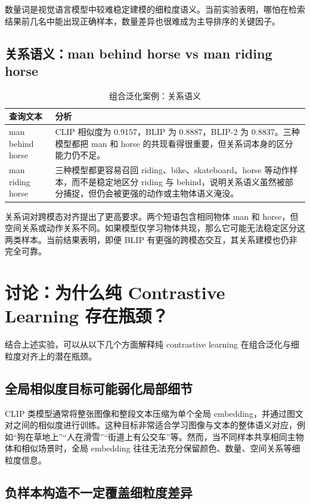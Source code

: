 \documentclass[UTF8,a4paper,10pt]{ctexart}
\begin{document}
数量词是视觉语言模型中较难稳定建模的细粒度语义。当前实验表明，哪怕在检索结果前几名中能出现正确样本，数量差异也很难成为主导排序的关键因子。

\subsection{关系语义：man behind horse vs man riding horse}

\begin{table}[H]
    \centering
    \caption{组合泛化案例：关系语义}
    \begin{tabular}{p{4cm}p{10cm}}
        \toprule
        查询文本 & 分析 \\
        \midrule
        man behind horse & CLIP 相似度为 0.9157，BLIP 为 0.8887，BLIP-2 为 0.8837。三种模型都把 man 和 horse 的共现看得很重要，但关系词本身的区分能力仍不足。 \\
        man riding horse & 三种模型都更容易召回 riding、bike、skateboard、horse 等动作样本，而不是稳定地区分 riding 与 behind，说明关系语义虽然被部分捕捉，但仍会被更强的动作或主物体语义淹没。 \\
        \bottomrule
    \end{tabular}
\end{table}

关系词对跨模态对齐提出了更高要求。两个短语包含相同物体 man 和 horse，但空间关系或动作关系不同。如果模型仅学习物体共现，那么它可能无法稳定区分这两类样本。当前结果表明，即便 BLIP 有更强的跨模态交互，其关系建模也仍非完全可靠。

\section{讨论：为什么纯 Contrastive Learning 存在瓶颈？}

结合上述实验，可以从以下几个方面解释纯 contrastive learning 在组合泛化与细粒度对齐上的潜在瓶颈。

\subsection{全局相似度目标可能弱化局部细节}

CLIP 类模型通常将整张图像和整段文本压缩为单个全局 embedding，并通过图文对之间的相似度进行训练。这种目标非常适合学习图像与文本的整体语义对应，例如“狗在草地上”“人在滑雪”“街道上有公交车”等。然而，当不同样本共享相同主物体和相似场景时，全局 embedding 往往无法充分保留颜色、数量、空间关系等细粒度信息。

\subsection{负样本构造不一定覆盖细粒度差异}
\end{document}
